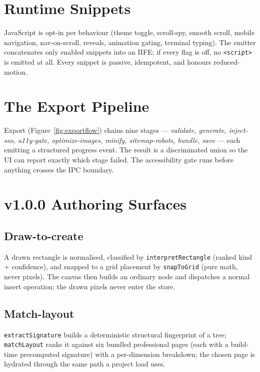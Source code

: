\section{Runtime Snippets}
JavaScript is opt-in per behaviour (theme toggle, scroll-spy, smooth scroll,
mobile navigation, nav-on-scroll, reveals, animation gating, terminal typing).
The emitter concatenates only enabled snippets into an IIFE; if every flag is
off, no \texttt{<script>} is emitted at all. Every snippet is passive, idempotent,
and honours reduced-motion.

\section{The Export Pipeline}
Export (Figure~\ref{fig:exportflow}) chains nine stages ---
\emph{validate, generate, inject-seo, a11y-gate, optimize-images, minify,
sitemap-robots, bundle, save} --- each emitting a structured progress event. The
result is a discriminated union so the UI can report exactly which stage failed.
The accessibility gate runs before anything crosses the IPC boundary.

\section{v1.0.0 Authoring Surfaces}
\subsection{Draw-to-create}
A drawn rectangle is normalised, classified by \texttt{interpretRectangle} (ranked
kind + confidence), and snapped to a grid placement by \texttt{snapToGrid} (pure
math, never pixels). The canvas then builds an ordinary node and dispatches a
normal insert operation; the drawn pixels never enter the store.

\subsection{Match-layout}
\texttt{extractSignature} builds a deterministic structural fingerprint of a tree;
\texttt{matchLayout} ranks it against six bundled professional pages (each with a
build-time precomputed signature) with a per-dimension breakdown; the chosen page
is hydrated through the same path a project load uses.

